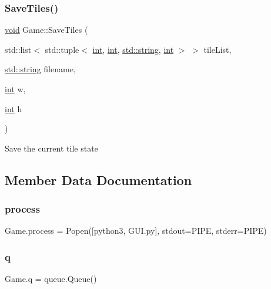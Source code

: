 \subsubsection{\texorpdfstring{SaveTiles()}{SaveTiles()}}
{\footnotesize\ttfamily \mbox{\hyperlink{_s_d_l__opengles2__gl2ext_8h_ae5d8fa23ad07c48bb609509eae494c95}{void}} Game\+::\+Save\+Tiles (\begin{DoxyParamCaption}\item[{std\+::list$<$ std\+::tuple$<$ \mbox{\hyperlink{warnings_8h_a74f207b5aa4ba51c3a2ad59b219a423b}{int}}, \mbox{\hyperlink{warnings_8h_a74f207b5aa4ba51c3a2ad59b219a423b}{int}}, \mbox{\hyperlink{_s_d_l__opengl__glext_8h_ab4ccfaa8ab0e1afaae94dc96ef52dde1}{std\+::string}}, \mbox{\hyperlink{warnings_8h_a74f207b5aa4ba51c3a2ad59b219a423b}{int}} $>$ $>$}]{tile\+List,  }\item[{\mbox{\hyperlink{_s_d_l__opengl__glext_8h_ab4ccfaa8ab0e1afaae94dc96ef52dde1}{std\+::string}}}]{filename,  }\item[{\mbox{\hyperlink{warnings_8h_a74f207b5aa4ba51c3a2ad59b219a423b}{int}}}]{w,  }\item[{\mbox{\hyperlink{warnings_8h_a74f207b5aa4ba51c3a2ad59b219a423b}{int}}}]{h }\end{DoxyParamCaption})}

Save the current tile state 

\subsection{Member Data Documentation}
\mbox{\label{class_game_a822fbaa2802a646fcdf2271bf422a6c6}} 
\subsubsection{\texorpdfstring{process}{process}}
{\footnotesize\ttfamily Game.\+process = Popen(\mbox{[}\textquotesingle{}python3\textquotesingle{}, \textquotesingle{}G\+U\+I.\+py\textquotesingle{}\mbox{]}, stdout=P\+I\+PE, stderr=P\+I\+PE)}

\mbox{\label{class_game_a6567b017dc559d77cb86f65b802c5913}} 
\subsubsection{\texorpdfstring{q}{q}}
{\footnotesize\ttfamily Game.\+q = queue.\+Queue()}

